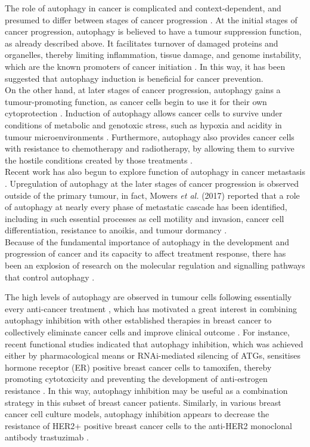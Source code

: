 The role of autophagy in cancer is complicated and context-dependent, and presumed to differ between stages of cancer progression \cite{Zarzynska2014}. At the initial stages of cancer progression, autophagy is believed to have a tumour suppression function, as already described above.  It facilitates turnover of damaged proteins and organelles, thereby limiting inflammation, tissue damage, and genome instability, which are the known promoters of cancer initiation \cite{Maycotte2014a}. In this way, it has been suggested that autophagy induction is beneficial for cancer prevention.\\
On the other hand, at later stages of cancer progression, autophagy gains a tumour-promoting function, as cancer cells begin to use it for their own cytoprotection  \cite{Zarzynska2014}. Induction of autophagy allows cancer cells to survive under conditions of metabolic and genotoxic stress, such as hypoxia and acidity in tumour microenvironments \cite{MathewAutophagyStronger}. Furthermore, autophagy also provides cancer cells with resistance to chemotherapy and radiotherapy, by allowing them to survive the hostile conditions created by those treatments  \cite{Jain2013AutophagyTherapy.}. \\
Recent work has also begun to explore function of autophagy in cancer metastasis \cite{Mowers2017AutophagyMetastasis, Jain2013AutophagyTherapy.}. Upregulation of autophagy at the later stages of cancer progression is observed outside of the primary tumour, in fact, Mowers \textit{et al.} (2017) reported that a role of autophagy at nearly every phase of metastatic cascade has been identified, including in such essential processes as cell motility and invasion, cancer cell differentiation, resistance to anoikis, and tumour  dormancy \cite{Mowers2017AutophagyMetastasis}.\\

Because of the fundamental importance of autophagy in the development and progression of cancer and its capacity to affect treatment response, there has been an explosion of research on the molecular regulation and signalling pathways that control autophagy \cite{Jain2013AutophagyTherapy.}. 

The high levels of autophagy are observed in tumour cells following essentially every anti-cancer treatment \cite{kondo2005role}, which has motivated a great interest in combining autophagy inhibition with other established therapies in breast cancer to collectively eliminate cancer cells and improve clinical outcome \cite{DebnathTheCancer}. For instance, recent functional studies indicated that autophagy inhibition, which was achieved either by pharmacological means or RNAi-mediated silencing of ATGs, sensitises hormone receptor (ER) positive breast cancer cells to tamoxifen, thereby promoting cytotoxicity and preventing the development of anti-estrogen resistance \cite{schoenlein2009autophagy, DebnathTheCancer}. In this way, autophagy inhibition may be useful as a combination strategy in this subset of breast cancer patients. Similarly, in various breast cancer cell culture models, autophagy inhibition appears to decrease the resistance of HER2+ positive breast cancer cells to the anti-HER2 monoclonal antibody trastuzimab \cite{vazquez2009autophagy}. 

